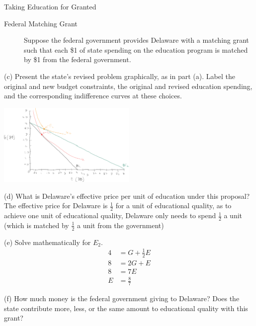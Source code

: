 \documentclass[8pt]{extarticle}
\begin{document}
\begin{problem}{Taking Education for Granted}
    \begin{description}
      \item[Federal Matching Grant] Suppose the federal government provides Delaware with a matching grant such that each \$1 of state spending on the education program is matched by \$1 from the federal government.
    \end{description}
    \begin{problem}{(c)}
      Present the state's revised problem graphically, as in part (a). Label the original and new budget constraints, the original and revised education spending, and the corresponding indifference curves at these choices.
      \tcblower
      \begin{center}
        \includegraphics[width=0.5\textwidth]{images/3_4_c.png}
      \end{center}
    \end{problem}
    \begin{problem}{(d)}
      What is Delaware's effective price per unit of education under this proposal?
      \tcblower
      The effective price for Delaware is $\frac{1}{2}$ for a unit of educational quality, as to achieve one unit of educational quality, Delaware only needs to spend $\frac{1}{2}$ a unit (which is matched by $\frac{1}{2}$ a unit from the government)
    \end{problem}
    \begin{problem}{(e)}
      Solve mathematically for $E_2$.
      \tcblower
      \begin{align*}
        4 &= G +  \frac{1}{2}E \\
        8 &= 2G + E \\
        8 &= 7E \tag*{substitute $G = 3E$}\\
        E &= \frac{8}{7}
      \end{align*}
    \end{problem}
    \begin{problem}{(f)}
      How much money is the federal government giving to Delaware? Does the state contribute more, less, or the same amount to educational quality with this grant?
      \tcblower

\end{problem}
\end{problem}
\end{document}
